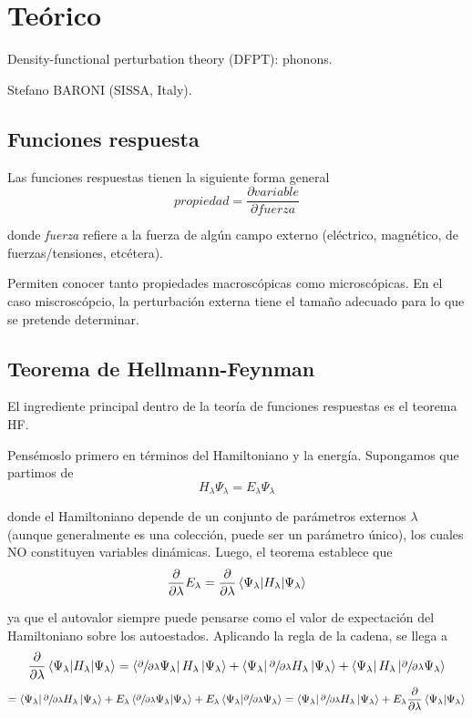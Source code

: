 \section{Teórico}

   Density-functional perturbation theory (DFPT): phonons.

   Stefano BARONI (SISSA, Italy).

\subsection{Funciones respuesta}

  Las funciones respuestas tienen la siguiente forma general
    $$propiedad = \frac{\partial variable}{\partial fuerza}$$

  donde \emph{fuerza} refiere a la fuerza de algún campo externo (eléctrico, magnético, de fuerzas/tensiones, etcétera).

  Permiten conocer tanto propiedades macroscópicas como microscópicas. En el caso miscroscópcio, la perturbación externa tiene el tamaño adecuado para lo que se pretende determinar.

\subsection{Teorema de Hellmann-Feynman}

  El ingrediente principal dentro de la teoría de funciones respuestas es el teorema HF.

  Pensémoslo primero en términos del Hamiltoniano y la energía. Supongamos que partimos de
    $$H_{\lambda} \Psi_{\lambda} = E_{\lambda} \Psi_{\lambda}$$

  donde el Hamiltoniano depende de un conjunto de parámetros externos ${\lambda}$ (aunque generalmente es una colección, puede ser un parámetro único), los cuales NO constituyen variables dinámicas. Luego, el teorema establece que
    $$\frac{\partial}{\partial \lambda} E_{\lambda} = \frac{\partial}{\partial \lambda} \expval{H_{\lambda}}{\Psi_{\lambda}}$$

  ya que el autovalor siempre puede pensarse como el valor de expectación del Hamiltoniano sobre los autoestados. Aplicando la regla de la cadena, se llega a
    $$\frac{\partial}{\partial \lambda} \expval{H_{\lambda}}{\Psi_{\lambda}} =
    \bra{\sfrac{\partial}{\partial \lambda} \Psi_{\lambda}} H_{\lambda} \ket{\Psi_{\lambda}} +
    \bra{\Psi_{\lambda}} \sfrac{\partial}{\partial \lambda}  H_{\lambda} \ket{\Psi_{\lambda}} +
    \bra{\Psi_{\lambda}} H_{\lambda} \ket{\sfrac{\partial}{\partial \lambda} \Psi_{\lambda}}$$
    $$= \bra{\Psi_{\lambda}} \sfrac{\partial}{\partial \lambda}  H_{\lambda} \ket{\Psi_{\lambda}} +
    E_{\lambda} \bra{\sfrac{\partial}{\partial \lambda} \Psi_{\lambda}} \ket{\Psi_{\lambda}} +
    E_{\lambda} \bra{\Psi_{\lambda}} \ket{\sfrac{\partial}{\partial \lambda} \Psi_{\lambda}} =
    \bra{\Psi_{\lambda}} \sfrac{\partial}{\partial \lambda}  H_{\lambda} \ket{\Psi_{\lambda}} +
    E_{\lambda} \frac{\partial}{\partial \lambda} \braket{\Psi_{\lambda}}$$

